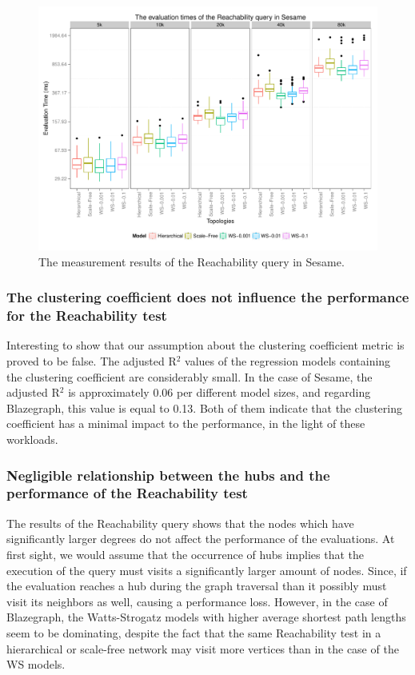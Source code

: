 \begin{figure}[!ht]
	\centering
	\includegraphics[width=160mm, keepaspectratio]{figures/sesame_q1.pdf}
	\caption{The measurement results of the Reachability query in Sesame.}
	\label{fig:sesame_q1}
\end{figure}

\subsubsection{The clustering coefficient does not influence the performance for the Reachability test}

Interesting to show that our assumption about the clustering coefficient metric is proved to be false. The adjusted R$^2$ values of the regression models containing the clustering coefficient are considerably small. In the case of Sesame, the adjusted R$^2$ is approximately 0.06 per different model sizes, and regarding Blazegraph, this value is equal to 0.13. Both of them indicate that the clustering coefficient has a minimal impact to the performance, in the light of these workloads.

\subsubsection{Negligible relationship between the hubs and the performance of the Reachability test}

The results of the Reachability query shows that the nodes which have significantly larger degrees do not affect the performance of the evaluations. At first sight, we would assume that the occurrence of hubs implies that the execution of the query must visits a significantly larger amount of nodes. Since, if the evaluation reaches a hub during the graph traversal than it possibly must visit its neighbors as well, causing a performance loss. However, in the case of Blazegraph, the Watts-Strogatz models with higher average shortest path lengths seem to be dominating, despite the fact that the same Reachability test in a hierarchical or scale-free network may visit more vertices than in the case of the WS models.

